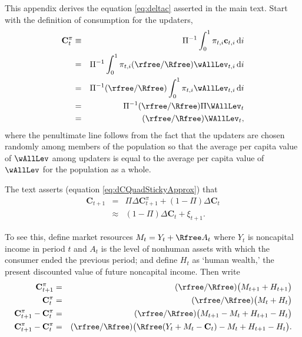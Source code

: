 
This appendix derives the equation \eqref{eq:deltac} asserted in the main text.  Start with the definition of consumption for the updaters,
\begin{eqnarray*}
   \mathbf{C}_{t}^{{\pi}}  & \equiv & \Pi^{-1}     \int_{0}^{1} \pi_{t,i}\mathbf{c}_{t,i} \,\text{d}i
\\   & = & \Pi^{-1}\int_{0}^{1} \pi_{t,i}(\rfree/\Rfree) \wAllLev_{t,i}\, \text{d}i \nonumber
\\   & = & \Pi^{-1}(\rfree/\Rfree) \int_{0}^{1} \pi_{t,i}\wAllLev_{t,i} \,\text{d}i \nonumber
\\   & = & \Pi^{-1}(\rfree/\Rfree) \Pi \WAllLev_{t} \nonumber
\\   & = & (\rfree/\Rfree) \WAllLev_{t}, \nonumber
\end{eqnarray*}
where the penultimate line follows from the fact that the updaters are
chosen randomly among members of the population so that the average
per capita value of $\wAllLev$ among updaters is equal to the
average per capita value of $\wAllLev$ for the population as a whole.


The text asserts (equation \eqref{eq:dCQuadStickyApprox}) that
\begin{eqnarray*}
        \mathbf{C}_{t+1} & = & \Pi \Delta \mathbf{C}^{{\pi}}_{t+1} + (1-\Pi) \Delta \mathbf{C}_{t} %
\\     & \approx & (1-\Pi) \Delta \mathbf{C}_{t} + \xi_{t+1}. \nonumber
\end{eqnarray*}

To see this, define market resources $M_{t}=Y_{t}+\Rfree A_{t}$ where $Y_{t}$ is noncapital income in period $t$ and $A_{t}$ is the level of nonhuman assets with which the consumer ended the previous period; and define $H_{t}$ as `human wealth,' the present discounted value of future noncapital income.  Then write
\begin{eqnarray}
        \mathbf{C}_{t+1}^{{\pi}} & = & (\rfree/\Rfree)\big(M_{t+1}+H_{t+1}\big)  \nonumber \\
        \mathbf{C}_{t}^{{\pi}} & = & (\rfree/\Rfree)\big(M_{t}+H_{t}\big)  \nonumber \\
        \mathbf{C}_{t+1}^{{\pi}}-\mathbf{C}_{t}^{{\pi}} & = & (\rfree/\Rfree)\big(M_{t+1}-M_{t}+H_{t+1}-H_{t}\big)  \nonumber
\\        \mathbf{C}_{t+1}^{{\pi}}-\mathbf{C}_{t}^{{\pi}} & = & (\rfree/\Rfree)\big(\Rfree(Y_{t}+M_{t}-\mathbf{C}_{t})-M_{t}+H_{t+1}-H_{t}\big).    \label{eq:notquite}
\end{eqnarray}

